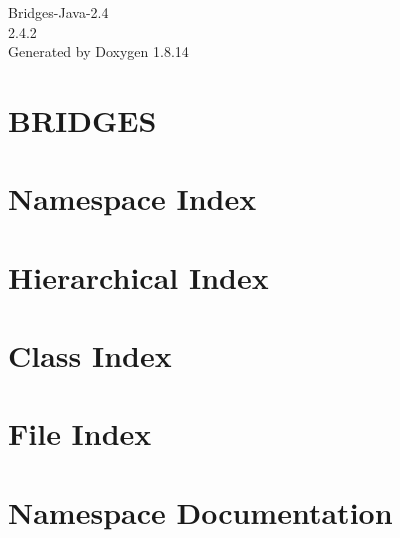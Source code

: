 \documentclass[twoside]{book}
\newcommand{\+}{\discretionary{\mbox{\scriptsize$\hookleftarrow$}}{}{}}
\newcommand{\clearemptydoublepage}{%
  \newpage{\pagestyle{empty}\cleardoublepage}%
}
\begin{document}
\hypersetup{pageanchor=false,
             bookmarksnumbered=true,
             pdfencoding=unicode
            }
\begin{titlepage}
\vspace*{7cm}
\begin{center}%
{\Large Bridges-\/\+Java-\/2.4 \\[1ex]\large 2.\+4.\+2 }\\
\vspace*{1cm}
{\large Generated by Doxygen 1.8.14}\\
\end{center}
\end{titlepage}
\clearemptydoublepage
{}
\tableofcontents
\clearemptydoublepage
{}
\hypersetup{pageanchor=true}

\chapter{B\+R\+I\+D\+G\+ES}
\label{index}\hypertarget{index}{}
\chapter{Namespace Index}

\chapter{Hierarchical Index}

\chapter{Class Index}

\chapter{File Index}

\chapter{Namespace Documentation}





\end{document}
